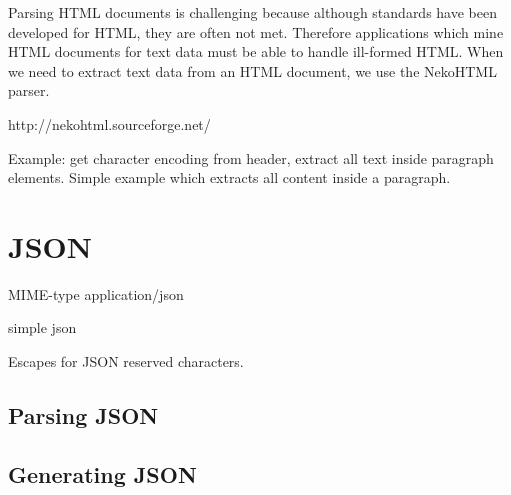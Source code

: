 Parsing HTML documents is challenging because although standards
have been developed for HTML, they are often not met.
Therefore applications which mine HTML documents for text data
must be able to handle ill-formed HTML.
When we need to extract text data from an HTML document,
we use the NekoHTML parser.

http://nekohtml.sourceforge.net/

Example:  get character encoding from header, extract all text inside paragraph elements.
Simple example which extracts all content inside a paragraph.

\section{JSON}

MIME-type application/json

simple json

Escapes for JSON reserved characters.

\subsection{Parsing JSON}

\subsection{Generating JSON}


